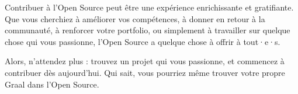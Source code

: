 Contribuer à l'Open Source peut être une expérience enrichissante et gratifiante. Que vous cherchiez à améliorer vos compétences, à donner en retour à la communauté, à renforcer votre portfolio, ou simplement à travailler sur quelque chose qui vous passionne, l'Open Source a quelque chose à offrir à tout·e·s.

Alors, n'attendez plus : trouvez un projet qui vous passionne, et commencez à contribuer dès aujourd'hui. Qui sait, vous pourriez même trouver votre propre Graal dans l'Open Source.